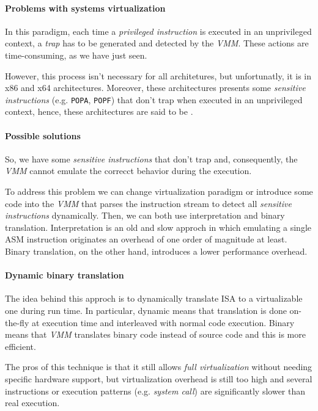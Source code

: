 \paragraph{Problems with systems virtualization}
In this paradigm, each time a \emph{privileged instruction} is executed in an
unprivileged context, a \emph{trap} has to be generated and detected by the
\emph{VMM}. These actions are time-consuming, as we have just seen.

However, this process isn't necessary for all architetures, but unfortunatly,
it is in x86 and x64 architectures. Moreover, these architectures presents
some \emph{sensitive instructions} (e.g. \texttt{POPA}, \texttt{POPF}) that
don't trap when executed in an unprivileged context, hence, these architectures
are said to be .

\paragraph{Possible solutions}
So, we have some \emph{sensitive instructions} that don't trap and,
consequently, the \emph{VMM} cannot emulate the correcct behavior during the
execution.

To address this problem we can change virtualization paradigm or introduce
some code into the \emph{VMM} that parses the instruction stream to detect
all \emph{sensitive instructions} dynamically. Then, we can both use
interpretation and binary translation. Interpretation is an old and slow approch
in which emulating a single ASM instruction originates an overhead of one order
of magnitude at least. Binary translation, on the other hand, introduces a
lower performance overhead.

\paragraph{Dynamic binary translation}
The idea behind this approch is to dynamically translate 
ISA to a virtualizable one during run time. In particular, dynamic means that
translation is done on-the-fly at execution time and interleaved with normal
code execution. Binary means that \emph{VMM} translates binary code instead of
source code and this is more efficient.

The pros of this technique is that it still allows \emph{full virtualization}
without needing specific hardware support, but virtualization overhead is still
too high and several instructions or execution patterns (e.g. \emph{system call})
are significantly slower than real execution.

